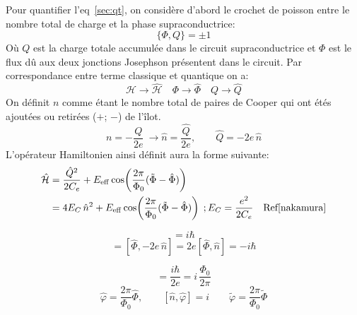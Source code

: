 Pour quantifier l'eq~\ref{sec:qt}, on considère d'abord le crochet de poisson entre le nombre total de charge et la phase supraconductrice:
\begin{equation}
\{\Phi, Q\}=\pm1
\end{equation}
Où $Q$ est la charge totale accumulée dans le circuit supraconductrice et $\Phi$ est le flux dû aux deux jonctions Josephson présentent dans le circuit. Par correspondance entre terme classique et quantique on a:
\begin{equation}
\mathcal{H}\rightarrow \hat{\mathcal{H}}\quad \Phi \rightarrow \hat{\Phi} \quad Q\rightarrow \hat{Q}
\end{equation}
On définit $n$ comme étant le nombre total de paires de Cooper qui ont étés ajoutées ou retirées ($+$; $-$)  de l'îlot.
\begin{equation}
n = -\frac{Q}{2e} \ \rightarrow \hat{n} = \frac{\hat{Q}}{2e}, \qquad \hat{Q} = -2e\,\hat{n}
\end{equation}
L'opérateur Hamiltonien ainsi définit aura la forme suivante:
\begin{align}
\mathcal{\hat{H}}
&= \frac{\hat{Q}^2}{2C_e}
+ E_{\mathrm{eff}} \cos\!\left( \frac{2\pi}{\Phi_0}(\tilde{\Phi} - \hat{\Phi}) \right)\\
&= 4E_C\,\hat{n}^2
+ E_{\mathrm{eff}} \cos\!\left( \frac{2\pi}{\Phi_0}(\tilde{\Phi}- \hat{\Phi}) \right)\; ;E_C=\frac{e^2}{2C_e} \quad \mbox{Ref\cite{nakamura}}
\end{align}

\begin{equation}
[\hat{\Phi},\hat{Q}] = i\hbar
\end{equation}
\begin{equation}
[\hat{\Phi},\hat{Q}] = [\hat{\Phi}, -2e\,\hat{n}]
= 2e[\hat{\Phi},\hat{n}] = -i\hbar
\end{equation}

\begin{equation}
[\hat{n},\hat{\Phi}] = \frac{i\hbar}{2e}
= i\,\frac{\Phi_0}{2\pi}
\end{equation}
\begin{equation}
\hat{\varphi} = \frac{2\pi}{\Phi_0}\hat{\Phi},
\qquad
[\hat{n},\hat{\varphi}] = i \qquad 
\tilde{\varphi}=\frac{2\pi}{\Phi_0}\tilde{\Phi}
\end{equation}



